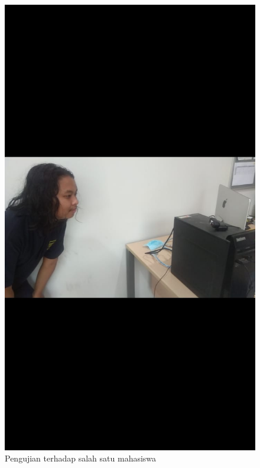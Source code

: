 \begin{figure} [p] \centering
    \includegraphics[scale=0.2]{gambar/ekadetect.jpeg}
    \caption{Pengujian terhadap salah satu mahasiswa}
    \label{fig:SfEka}
\end{figure}

